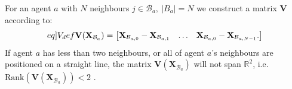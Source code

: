 For an agent $a$ with $N$ neighbours $j\in\mathcal{B}_{a},\:|B_{a}|=N$ we construct a matrix $\mathbf{V}$ according to:
\begin{equation}\label[eq]{V_def}
  \mathbf{V}(\mathbf{X}_{\mathcal{B}_{a}}) = \begin{bmatrix}
    \mathbf{X}_{\mathcal{B}_{a, 0}}-\mathbf{X}_{\mathcal{B}_{a, 1}}&\hdots&\mathbf{X}_{\mathcal{B}_{a, 0}}-\mathbf{X}_{\mathcal{B}_{a, N-1}}.
  \end{bmatrix}
\end{equation}
If agent $a$ has less than two neighbours, or all of agent $a$'s neighbours are positioned on a straight line, the matrix $\mathbf{V}(\mathbf{X}_{\mathcal{B}_{a}})$ will not span $\mathbb{R}^{2}$, i.e. $\mathrm{Rank}(\mathbf{V}(\mathbf{X}_{\mathcal{B}_{a}})) < 2$ .

